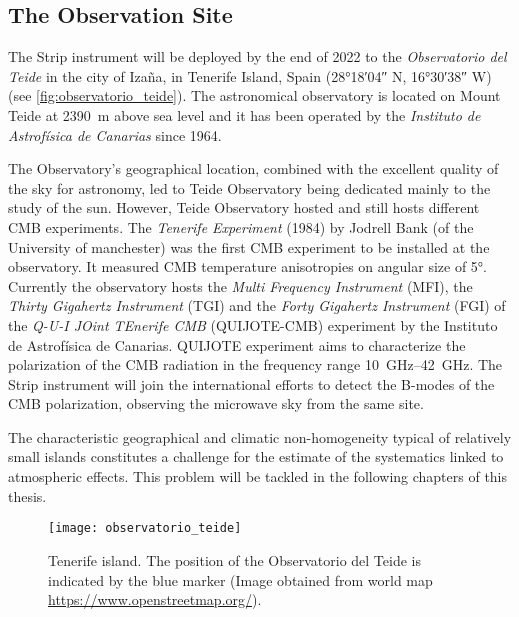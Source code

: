 \subsection{The Observation Site}

The Strip instrument will be deployed by the end of 2022 to the
\emph{Observatorio del Teide} in the city of Iza\~na, in Tenerife Island,
Spain (\ang{28;18;04} N, \ang{16;30;38} W) (see
\autoref{fig:observatorio_teide}). The astronomical observatory is located
on Mount Teide at \SI{2390}{\meter} above sea level and it has been
operated by the \emph{Instituto de Astrof\'isica de Canarias} since 1964.

The Observatory's geographical location, combined with the excellent
quality of the sky for astronomy, led to Teide Observatory being dedicated
mainly to  the study of the sun. However, Teide Observatory hosted and
still hosts different CMB experiments.
The \emph{Tenerife Experiment} (1984) by Jodrell Bank (of the University of
manchester) was the first CMB experiment to be installed at the
observatory. It measured CMB temperature anisotropies on angular size of
\ang{5}. Currently the observatory hosts the \emph{Multi Frequency
Instrument} (MFI), the \emph{Thirty Gigahertz Instrument} (TGI) and the
\emph{Forty Gigahertz Instrument} (FGI) of the \emph{Q-U-I JOint TEnerife
CMB} (QUIJOTE-CMB) experiment by the Instituto de Astrof\'isica de
Canarias. QUIJOTE experiment aims to characterize the
polarization of the CMB radiation in the frequency range
\SIrange{10}{42}{\giga\hertz}. The Strip instrument will join the
international efforts to detect the B-modes of the CMB polarization,
observing the microwave sky from the same site.

The characteristic geographical and climatic non-homogeneity typical of
relatively small islands constitutes a challenge for the estimate of the
systematics linked to atmospheric effects. This problem will be tackled in
the following chapters of this thesis.

\begin{figure}
        \centering
        \texttt{[image: observatorio\_teide]}
        \caption{Tenerife island. The position of the Observatorio del
        Teide is indicated by the blue marker (Image obtained from
        world map \url{https://www.openstreetmap.org/}).}
        \label{fig:observatorio_teide}
\end{figure}
